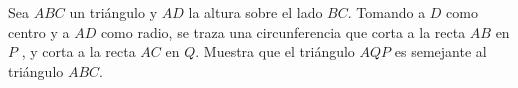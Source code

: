 Sea $ABC$ un triángulo y $AD$ la altura sobre el lado $BC$. Tomando a $D$ como centro y a
$AD$ como radio, se traza una circunferencia que corta a la recta $AB$ en $P$ , y corta a la
recta $AC$ en $Q$. Muestra que el triángulo $AQP$ es semejante al triángulo $ABC$.